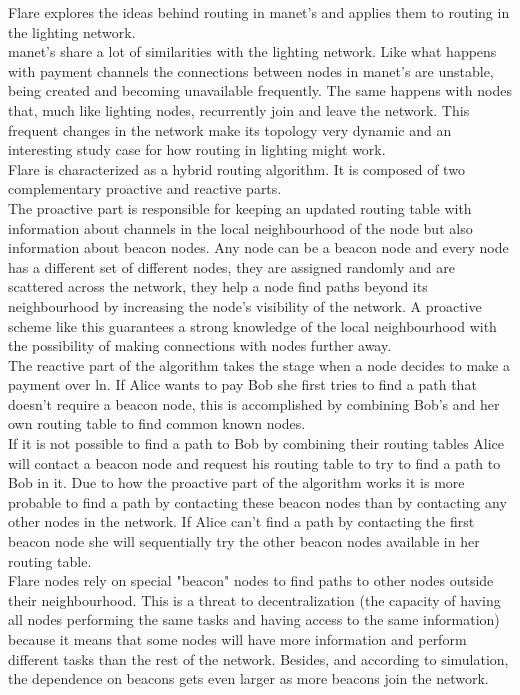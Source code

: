 Flare explores the ideas behind routing in \acrfull{manet}'s and applies them to routing in the lighting network.\\
\acrshort{manet}'s share a lot of similarities with the lighting network. Like what happens with payment channels the connections between nodes in \acrshort{manet}'s are unstable, being created and becoming unavailable frequently. The same happens with nodes that, much like lighting nodes, recurrently join and leave the network. This frequent changes in the network make its topology very dynamic and an interesting study case for how routing in lighting might work. \\
Flare is characterized as a hybrid routing algorithm. It is composed of two complementary proactive and reactive parts.\\
The proactive part is responsible for keeping an updated routing table with information about channels in the local neighbourhood of the node but also information about beacon nodes. Any node can be a beacon node and every node has a different set of different nodes, they are assigned randomly and are scattered across the network, they help a node find paths beyond its neighbourhood by increasing the node's visibility of the network. A proactive scheme like this guarantees a strong knowledge of the local neighbourhood with the possibility of making connections with nodes further away. \\ 
The reactive part of the algorithm takes the stage when a node decides to make a payment over \acrshort{ln}. If Alice wants to pay Bob she first tries to find a path that doesn't require a beacon node, this is accomplished by combining Bob's and her own routing table to find common known nodes. \\
If it is not possible to find a path to Bob by combining their routing tables Alice will contact a beacon node and request his routing table to try to find a path to Bob in it. Due to how the proactive part of the algorithm works it is more probable to find a path by contacting these beacon nodes than by contacting any other nodes in the network. If Alice can't find a path by contacting the first beacon node she will sequentially try the other beacon nodes available in her routing table.\\
Flare nodes rely on special "beacon" nodes to find paths to other nodes outside their neighbourhood. This is a threat to decentralization (the capacity of having all nodes performing the same tasks and having access to the same information) because it means that some nodes will have more information and perform different tasks than the rest of the network. Besides, and according to simulation, the dependence on beacons gets even larger as more beacons join the network. \\
